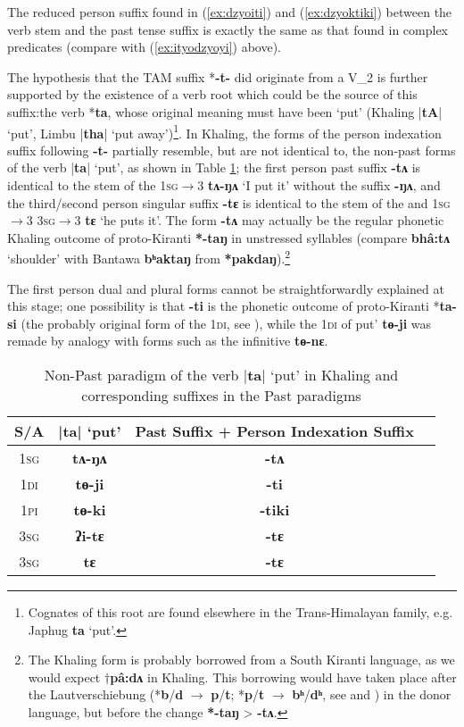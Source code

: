 \documentclass[oneside,a4paper,11pt]{article}
\newcommand{\ipa}[1]{{\phon\textbf{#1}}}
\newcommand{\dhatu}[2]{|\ipa{#1}| `#2'}
\newcommand{\refb}[1]{(\ref{#1})}
\begin{document}
The reduced person suffix found in \refb{ex:dzyoiti} and \refb{ex:dzyoktiki} between the verb stem and the past tense suffix is exactly the same as that found in complex predicates (compare with \refb{ex:ityodzyoyi} above). 

The hypothesis that the TAM suffix *\ipa{-t-} did originate from a V_2 is further supported by the existence of a verb root which could be the source of this suffix:the verb *\ipa{ta}, whose original meaning must have been `put' (Khaling \dhatu{tA}{put}, Limbu \dhatu{tha}{put away})\footnote{Cognates of this root are found elsewhere in the Trans-Himalayan family, e.g. Japhug \ipa{ta} `put'.}.  In Khaling, the forms of the person indexation suffix  following \ipa{-t-} partially resemble, but are not identical to, the non-past forms of the verb \dhatu{ta}{put}, as shown in Table \ref{tab:tANA}; the first person past suffix \ipa{-tʌ} is identical to the stem of the \textsc{1sg$\rightarrow$3}  \ipa{tʌ-ŋʌ} `I put it' without the suffix \ipa{-ŋʌ}, and the third/second person singular suffix \ipa{-tɛ} is identical to the stem of the and \textsc{1sg$\rightarrow$3} \textsc{3sg$\rightarrow$3}  \ipa{tɛ} `he puts it'. The form \ipa{-tʌ} may actually be the regular phonetic Khaling outcome of proto-Kiranti \ipa{*-taŋ} in unstressed syllables (compare \ipa{bhâ:tʌ} `shoulder' with Bantawa \ipa{bʰaktaŋ} from \ipa{*pakdaŋ}).\footnote{The Khaling form is probably borrowed from a South Kiranti language, as we would expect $\dagger$\ipa{pâ:dʌ} in Khaling. This borrowing would have taken place after the Lautverschiebung (*\ipa{b}/\ipa{d} $\rightarrow$ \ipa{p}/\ipa{t}; *\ipa{p}/\ipa{t} $\rightarrow$ \ipa{bʰ}/\ipa{dʰ}, see \citealt{michailovsky94stops} and \citealt{jacques17pkiranti}) in the donor language, but before the change \ipa{*-taŋ} > \ipa{-tʌ}.}


 The first person dual and plural forms cannot be straightforwardly explained at this stage; one possibility is that \ipa{-ti} is the phonetic outcome of proto-Kiranti *\ipa{ta-si} (the probably original form of the \textsc{1di}, see \citealt[58]{jacques16tonogenesis}), while the \textsc{1di} of  put' \ipa{tɵ-ji} was remade by analogy with forms such as the infinitive \ipa{tɵ-nɛ}.

\begin{table}[H]
\caption{Non-Past paradigm of the verb \dhatu{ta}{put} in Khaling and corresponding suffixes in the Past paradigms} \centering \label{tab:tANA}
\begin{tabular}{cccc}
\toprule
S/A & \dhatu{ta}{put} & Past Suffix + Person Indexation Suffix \\
\midrule
\textsc{1sg} & \ipa{tʌ-ŋʌ} &  \ipa{-tʌ}  \\
\textsc{1di} & \ipa{tɵ-ji} &  \ipa{-ti}  \\
\textsc{1pi} & \ipa{tɵ-ki} & \ipa{-tiki}  \\
\textsc{3sg} & \ipa{ʔi-tɛ} & \ipa{-tɛ}  \\
\textsc{3sg} & \ipa{tɛ} & \ipa{-tɛ}  \\
\bottomrule
\end{tabular}
\end{table}
\end{document}
